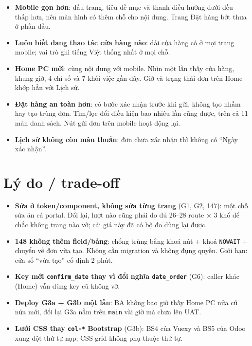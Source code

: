 \begin{itemize}[nosep]
\item \textbf{Mobile gọn hơn}: đầu trang, tiêu đề mục và thanh điều hướng dưới đều thấp hơn, nên màn hình có thêm chỗ
  cho nội dung. Trang Đặt hàng bớt thưa ở phần đầu.
\item \textbf{Luôn biết đang thao tác cửa hàng nào}: dải cửa hàng có ở mọi trang mobile; vai trò ghi tiếng Việt thống nhất
  ở mọi chỗ.
\item \textbf{Home PC mới}: cùng nội dung với mobile. Nhìn một lần thấy cửa hàng, khung giờ, 4 chỉ số và 7 khối việc
  gần đây. Giờ và trạng thái đơn trên Home khớp hẳn với Lịch sử.
\item \textbf{Đặt hàng an toàn hơn}: có bước xác nhận trước khi gửi, không tạo nhầm hay tạo trùng đơn. Tìm/lọc đổi
  điều kiện bao nhiêu lần cũng được, trên cả 11 màn danh sách. Nút gửi đơn trên mobile hoạt động lại.
\item \textbf{Lịch sử không còn mâu thuẫn}: đơn chưa xác nhận thì không có ``Ngày xác nhận''.
\end{itemize}

\section{Lý do / trade-off}

\begin{itemize}[nosep]
\item \textbf{Sửa ở token/component, không sửa từng trang} (G1, G2, 147): một chỗ sửa ăn cả portal. Đổi lại, lượt nào cũng
  phải đo đủ 26--28 route $\times$ 3 khổ để chắc không trang nào vỡ; cái giá này đã có bộ đo dùng lại được.
\item \textbf{148 không thêm field/bảng}: chống trùng bằng khoá nút + khoá \texttt{NOWAIT} + chuyển về đơn vừa tạo.
  Không cần migration và không đụng quyền. Giới hạn: cửa sổ ``vừa tạo'' cố định 2 phút.
\item \textbf{Key mới \texttt{confirm\_date} thay vì đổi nghĩa \texttt{date\_order}} (G6): caller khác (Home) vẫn dùng
  key cũ không vỡ.
\item \textbf{Deploy G3a + G3b một lần}: BA không bao giờ thấy Home PC nửa cũ nửa mới, đổi lại G3a nằm trên \texttt{main}
  vài giờ mà chưa lên UAT.
\item \textbf{Lưới CSS thay \texttt{col-*} Bootstrap} (G3b): BS4 của Vuexy và BS5 của Odoo xung đột thứ tự nạp; CSS grid
  không phụ thuộc thứ tự.
\end{itemize}

